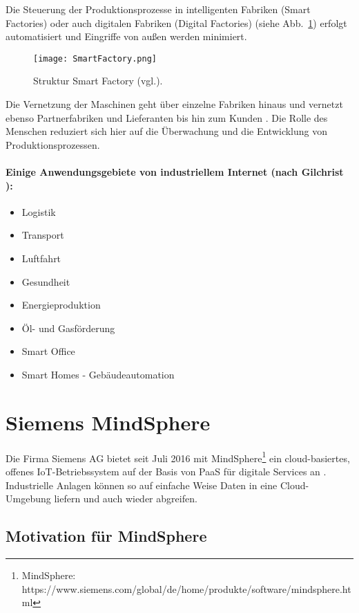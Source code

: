 Die Steuerung der Produktionsprozesse in intelligenten Fabriken (Smart Factories) oder auch digitalen Fabriken (Digital Factories) (siehe Abb.~\ref{fig:smartFactory}) erfolgt automatisiert und Eingriffe von außen werden minimiert.

\begin{figure}%
\centering
\texttt{[image: SmartFactory.png]} 
\caption{Struktur Smart Factory (vgl.\cite{gilchrist2016industry}).}
\label{fig:smartFactory}
\end{figure}

Die Vernetzung der Maschinen geht über einzelne Fabriken hinaus und vernetzt ebenso Partnerfabriken und Lieferanten bis hin zum Kunden \parencite{andelfinger2014internet}. Die Rolle des Menschen reduziert sich hier auf die Überwachung und die Entwicklung von Produktionsprozessen.

\paragraph{Einige Anwendungsgebiete von industriellem Internet (nach Gilchrist \parencite{gilchrist2016industry}):}
\begin{itemize}
\item Logistik
\item Transport
\item Luftfahrt
\item Gesundheit
\item Energieproduktion
\item Öl- und Gasförderung
\item Smart Office
\item Smart Homes - Gebäudeautomation
\end{itemize}
\vspace{\baselineskip}


\section{Siemens MindSphere}
Die Firma Siemens AG bietet seit Juli 2016 mit MindSphere\footnote{MindSphere: https://www.siemens.com/global/de/home/produkte/software/mindsphere.html} ein cloud-basiertes, offenes \ac{IoT}-Betriebssystem auf der Basis von \ac{PaaS} für digitale Services an \parencite{SiemensMSIntroduction,SiemensWhitepaper}. Industrielle Anlagen können so auf einfache Weise Daten in eine Cloud-Umgebung liefern und auch wieder abgreifen. 

\subsection{Motivation für MindSphere}

